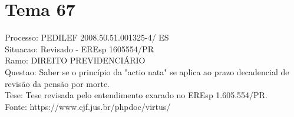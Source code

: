 \documentclass[12pt]{article}
\begin{document}
\section*{Tema 67}
Processo: PEDILEF 2008.50.51.001325-4/ ES\\
Situacao: Revisado - EREsp 1605554/PR\\
Ramo: DIREITO PREVIDENCIÁRIO\\
Questao: Saber se o princípio da "actio nata" se aplica ao prazo decadencial de revisão da pensão por morte.\\
Tese: Tese revisada pelo entendimento exarado no EREsp 1.605.554/PR.\\
Fonte: https://www.cjf.jus.br/phpdoc/virtus/
\end{document}
